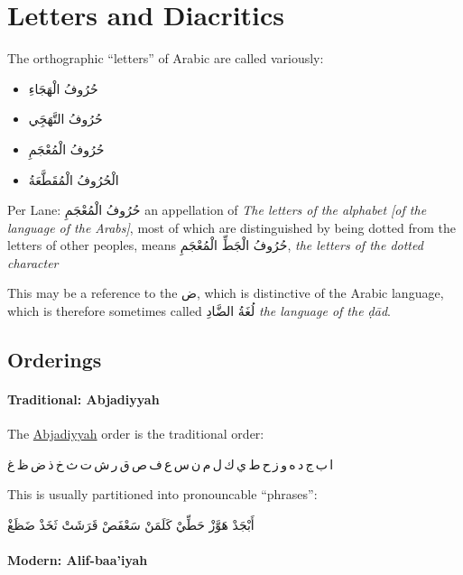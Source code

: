\documentclass[11pt]{article}
\begin{document}
\section{Letters and Diacritics}

The orthographic “letters” of Arabic are called variously:

\begin{itemize}
\item \textarabic{حُرُوفُ الْهَجَاءِ}
\item \textarabic{حُرُوفُ التَّهَجَِي}
\item \textarabic{حُرُوفُ الْمُعْجَمِ}
\item \textarabic{الْحُرُوفُ الْمُقَطَّعَةُ}
\end{itemize}

Per Lane: \textarabic{حُرُوفُ الْمُعْجَمِ} an appellation of \textit{The
  letters of the alphabet [of the language of the Arabs]}, most of
which are distinguished by being dotted from the letters of other
peoples, means \textarabic{حُرُوفُ الْجَطِّ الْمُعْجَمِ}, \textit{the letters of
  the dotted character}

This may be a reference to the \textarabic{ض}, which is distinctive of
the Arabic language, which is therefore sometimes called
\textarabic{لُغَةُ الضَّادِ} \textit{the language of the ḍād}.

\subsection{Orderings}

\paragraph{Traditional: Abjadiyyah}

The \href{https://en.wikipedia.org/wiki/Abjad}{Abjadiyyah} order is
the traditional order:

\textarabic{
ا\,ب\,ج\,د\,ه\,و\,ز\,ح\,ط\,ي\,ك\,ل\,م\,ن\,س\,ع\,ف\,ص\,ق\,ر\,ش\,ت\,ث\,خ\,ذ\,ض\,ظ\,غ}

\vspace{10pt}
\noindent
This is usually partitioned into pronouncable “phrases”:

\vspace{8pt}
\textarabic{أَبْجَدْ هَ‍وَّزْ حَطِّيْ كَلَمَنْ سَعْفَصْ قَرَشَتْ ثَخَذْ ضَظَغْ}

\paragraph{Modern: Alif-baa'iyah}
\end{document}

